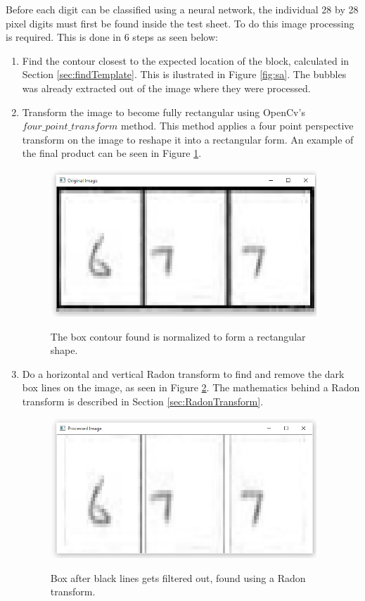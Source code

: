 Before each digit can be classified using a neural network, the individual 28 by 28 pixel digits must first be found inside the test sheet. To do this image processing is required. This is done in 6 steps as seen below:

\begin{enumerate}
\item Find the contour closest to the expected location of the block, calculated in Section \ref{sec:findTemplate}. This is ilustrated in Figure \ref{fig:sa}. The bubbles was already extracted out of the image where they were processed.

\item Transform the image to become fully rectangular using OpenCv's $four\_point\_transform$ method. This method applies a four point perspective transform on the image to reshape it into a rectangular form. An example of the final product can be seen in Figure \ref{fig:bp}.

\begin{figure}
  \centering
  \includegraphics[width=10cm]{BeforeProcessing}\\
  \caption{The box contour found is normalized to form a rectangular shape.}
  \label{fig:bp}
\end{figure}

\item Do a horizontal and vertical Radon transform to find and remove the dark box lines on the image, as seen in Figure \ref{fig:ar}. The mathematics behind a Radon transform is described in Section \ref{sec:RadonTransform}.

\begin{figure}
  \centering
  \includegraphics[width=10cm]{AfterRadon}\\
  \caption{Box after black lines gets filtered out, found using a Radon transform.}
  \label{fig:ar}
\end{figure}


\end{enumerate}

